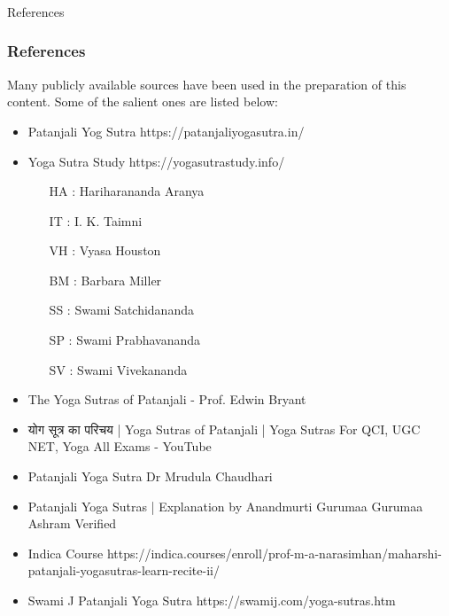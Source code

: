 \begin{frame}[fragile]\frametitle{}
\begin{center}
{\Large References}
\end{center}
\end{frame}


\begin{frame}[fragile]\frametitle{References}

Many publicly available sources have been used in the preparation of this content. Some of the salient ones are listed below:

	\begin{itemize}
	\item Patanjali Yog Sutra https://patanjaliyogasutra.in/
	\item Yoga Sutra Study https://yogasutrastudy.info/
		\begin{itemize}
		\item [HA]: Hariharananda Aranya
		\item [IT]: I. K. Taimni
		\item [VH]: Vyasa Houston
		\item [BM]: Barbara Miller
		\item [SS]: Swami Satchidananda
		\item [SP]: Swami Prabhavananda
		\item [SV]: Swami Vivekananda
		\end{itemize}	
	\item The Yoga Sutras of Patanjali - Prof. Edwin Bryant
	\item योग सूत्र का परिचय | Yoga Sutras of Patanjali | Yoga Sutras For QCI, UGC NET, Yoga All Exams - YouTube
	\item Patanjali Yoga Sutra Dr Mrudula Chaudhari
	\item Patanjali Yoga Sutras | Explanation by Anandmurti Gurumaa Gurumaa Ashram Verified
	\item Indica Course https://indica.courses/enroll/prof-m-a-narasimhan/maharshi-patanjali-yogasutras-learn-recite-ii/
	\item Swami J Patanjali Yoga Sutra https://swamij.com/yoga-sutras.htm
	\end{itemize}

\end{frame}

